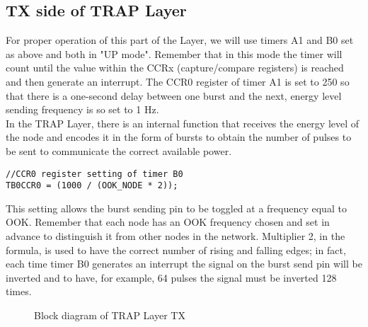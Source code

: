 \subsection{TX side of TRAP Layer}
For proper operation of this part of the Layer, we will use timers A1 and B0 set as above and both in "UP mode". Remember that in this mode the timer will count until the value within the CCRx (capture/compare registers) is reached and then generate an interrupt. The CCR0 register of timer A1 is set to 250 so that there is a one-second delay between one burst and the next, energy level sending frequency is so set to 1 Hz.\\
In the TRAP Layer, there is an internal function that receives the energy level of the node and encodes it in the form of bursts to obtain the number of pulses to be sent to communicate the correct available power.\\
\begin{lstlisting}
//CCR0 register setting of timer B0
TB0CCR0 = (1000 / (OOK_NODE * 2));
\end{lstlisting}
This setting allows the burst sending pin to be toggled at a frequency equal to OOK. Remember that each node has an OOK frequency chosen and set in advance to distinguish it from other nodes in the network. Multiplier 2, in the formula, is used to have the correct number of rising and falling edges; in fact, each time timer B0 generates an interrupt the signal on the burst send pin will be inverted and to have, for example, 64 pulses the signal must be inverted 128 times.\\
  \begin{figure}[H]
    \centerline{}
    \caption{\footnotesize \centering Block diagram of TRAP Layer TX}
    \label{fig:TRAPLayerTimer}
  \end{figure}
  
